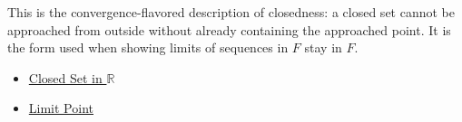 \begin{remark*}[Interpretation]
This is the convergence-flavored description of closedness: a closed set cannot be approached from outside without already containing the approached point. It is the form used when showing limits of sequences in $F$ stay in $F$.
\end{remark*}
\begin{dependencies}
\begin{itemize}
  \item \hyperref[def:closed-set]{Closed Set in $\mathbb{R}$}
  \item \hyperref[def:limit-point]{Limit Point}
\end{itemize}
\end{dependencies}
